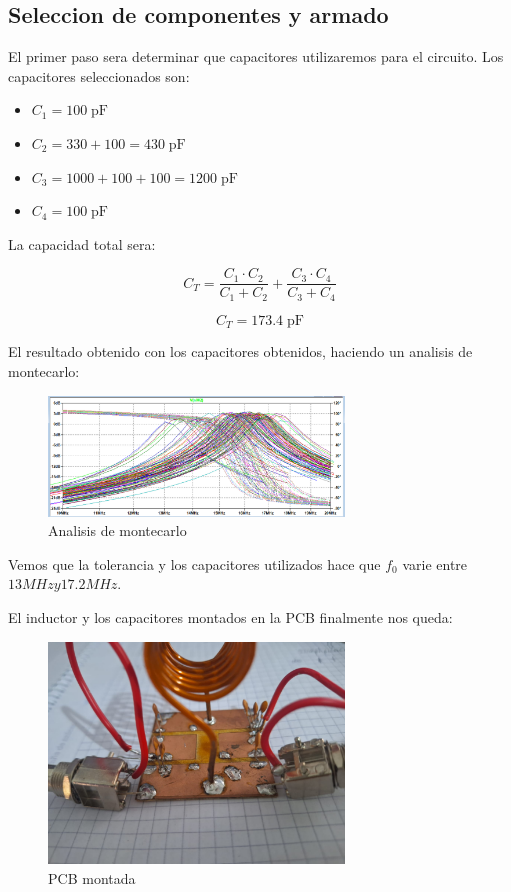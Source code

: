 \newpage
\subsection{Seleccion de componentes y armado}

El primer paso sera determinar que capacitores utilizaremos para el circuito. Los capacitores seleccionados son:

\begin{itemize}
    \item $C_1 = 100\; \text{pF}$
    \item $C_2 = 330 + 100 = 430\; \text{pF}$
    \item $C_3 = 1000 + 100 + 100 =1200\; \text{pF}$
    \item $C_4 = 100\; \text{pF}$
\end{itemize}

La capacidad total sera:

\begin{equation}
    C_T = \frac{C_1 \cdot C_2}{C_1 + C_2} + \frac{C_3 \cdot C_4}{C_3 + C_4} 
\end{equation}

\begin{equation}
    C_T = 173.4 \; \text{pF}
\end{equation}

El resultado obtenido con los capacitores obtenidos, haciendo un analisis de montecarlo:

\begin{figure}[h]
    \centering
    \includegraphics[width=0.7\textwidth]{Imagenes/montecarlo.png}
    \caption{Analisis de montecarlo}
\end{figure}

Vemos que la tolerancia y los capacitores utilizados hace que $f_0$ varie entre $13 MHz y 17.2 MHz$.


El inductor y los capacitores montados en la PCB finalmente nos queda:

\begin{figure}[h]
    \centering
    \includegraphics[width=0.7\textwidth]{Imagenes/pcb1.jpeg}
    \caption{PCB montada}
\end{figure}


